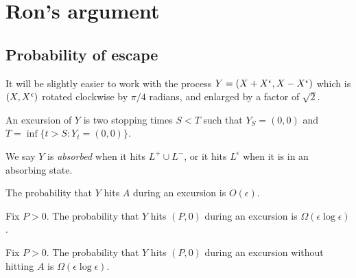 {
\section{Ron's argument}

\newcommand{\bandwidth}{\delta}
\newcommand{\rotproc}{Y}

\newcommand{\union}{\cup}
\renewcommand{\L}{L^+ \union L^-}
\newcommand{\Le}{L^\epsilon}

\subsection{Probability of escape}

It will be slightly easier to work with the process $\rotproc =
(\sampled + \resamplede, \sampled - \resamplede)$ which is $(X,
X^{\epsilon})$ rotated clockwise by $\pi / 4$ radians, and enlarged by a factor of
$\sqrt{2}$.

\newcommand{\boundarylines}{A}

\begin{definition}
  An excursion of $Y$ is two stopping times $S < T$ such that $Y_S =
  (0,0)$ and $T = \inf\{ t > S : Y_t = (0,0) \}$.  
\end{definition}

\begin{definition}
  We say $Y$ is \emph{absorbed} when it hits $\L$, or it hits $\Le$
  when it is in an absorbing state.
\end{definition}

\begin{lemma}
  \label{lem:Phitboundaryline}
  The probability that $Y$ hits $\boundarylines$ during an excursion
  is $O(\epsilon)$.
\end{lemma}

\newcommand{\Omegaeloge}{\Omega(\epsilon\log\epsilon)}

\begin{lemma}
  \label{lem:Pabsorbedandtravelsfar}
  Fix $P > 0$.  The probability that $Y$ hits $(P,0)$ during an
  excursion is $\Omegaeloge$.
\end{lemma}

\begin{lemma}
  Fix $P > 0$.  The probability that $Y$ hits $(P,0)$ during an
  excursion without hitting $A$ is $\Omegaeloge$.
\end{lemma}

}
